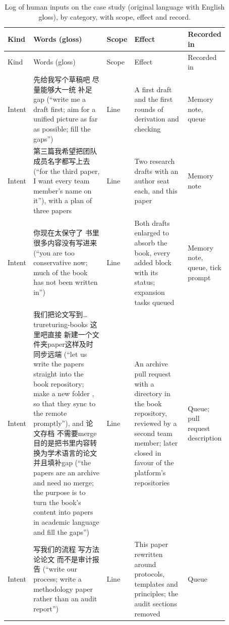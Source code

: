 \documentclass[11pt]{article}
\newcommand{\code}[1]{\texttt{\detokenize{#1}}}
\newcommand{\zh}[1]{#1}
\begin{document}
\begingroup\scriptsize
\setlength{\LTpre}{4pt}\setlength{\LTpost}{4pt}
\begin{longtable}{@{}>{\raggedright\arraybackslash}p{0.1\linewidth}>{\raggedright\arraybackslash}p{0.33\linewidth}>{\raggedright\arraybackslash}p{0.07\linewidth}>{\raggedright\arraybackslash}p{0.24\linewidth}>{\raggedright\arraybackslash}p{0.13\linewidth}@{}}
\caption{Log of human inputs on the case study (original language with English
gloss), by category, with scope, effect and record.}
\label{tab:interventions}\\
\toprule Kind & Words (gloss) & Scope & Effect & Recorded in \\ \midrule\endfirsthead
\toprule Kind & Words (gloss) & Scope & Effect & Recorded in \\ \midrule\endhead
\bottomrule\endlastfoot
Intent & \zh{先给我写个草稿吧 尽量能够大一统 补足gap} (``write me a draft first; aim for a unified picture as far as possible; fill the gaps'') & Line & A first draft and the first rounds of derivation and checking & Memory note, queue \\
Intent & \zh{第三篇我希望把团队成员名字都写上去} (``for the third paper, I want every team member's name on it''), with a plan of three papers & Line & Two research drafts with an author seat each, and this paper & Memory note \\
Intent & \zh{你现在太保守了 书里很多内容没有写进来} (``you are too conservative now; much of the book has not been written in'') & Line & Both drafts enlarged to absorb the book, every added block with its status; expansion tasks queued & Memory note, queue, tick prompt \\
Intent & \zh{我们把论文写到…trureturing-books 这里吧直接 新建一个文件夹paper这样及时同步远端} (``let us write the papers straight into the book repository; make a new folder \code{paper}, so that they sync to the remote promptly''), and \zh{论文存档 不需要merge 目的是把书里内容转换为学术语言的论文并且填补gap} (``the papers are an archive and need no merge; the purpose is to turn the book's content into papers in academic language and fill the gaps'') & Line & An archive pull request with a \code{paper/} directory in the book repository, reviewed by a second team member; later closed in favour of the platform's repositories & Queue; pull request description \\
Intent & \zh{写我们的流程 写方法论论文 而不是审计报告} (``write our process; write a methodology paper rather than an audit report'') & Line & This paper rewritten around protocols, templates and principles; the audit sections removed & Queue \\

\end{longtable}
\end{document}
